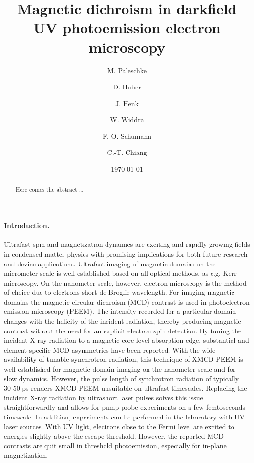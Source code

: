 \documentclass[prl,twocolumn,floatfix]{revtex4-2}
\begin{document}
\title{Magnetic dichroism in darkfield UV photoemission electron microscopy}

\author{M. Paleschke}
\author{D. Huber}
\author{J. Henk}
\author{W. Widdra}

\author{F. O. Schumann}

\author{C.-T. Chiang}

\date{\today}

\begin{abstract}
Here comes the abstract \ldots
\end{abstract}

\pacs{}

\maketitle
\paragraph{Introduction.} Ultrafast spin and magnetization dynamics are exciting and rapidly growing fields in condensed matter physics with promising implications for both future research and device applications. Ultrafast imaging of magnetic domains on the micrometer scale is well established based on all-optical methods, as e.g. Kerr microscopy. On the nanometer scale, however, electron microscopy is the method of choice due to electrons short de Broglie wavelength. 
For imaging magnetic domains the magnetic circular dichroism (MCD) contrast is used in photoelectron emission microscopy (PEEM). The intensity recorded for a particular domain changes with the helicity of the incident radiation, thereby producing magnetic contrast without the need for an explicit electron spin detection. By tuning the incident X-ray radiation to a magnetic core level absorption edge, substantial and element-specific MCD asymmetries have been reported. With the wide availability of tunable synchrotron radiation, this technique of XMCD-PEEM is well established for magnetic domain imaging on the nanometer scale and for slow dynamics. However, the pulse length of synchrotron radiation of typically 30-50 ps renders XMCD-PEEM unsuitable on ultrafast timescales. 
Replacing the incident X-ray radiation by ultrashort laser pulses solves this issue straightforwardly and allows for pump-probe experiments on a few femtoseconds timescale. In addition, experiments can be performed in the laboratory with UV laser sources. 
With UV light, electrons close to the Fermi level are excited to energies slightly above the escape threshold. However, the reported MCD contrasts are quit small in threshold photoemission, especially for in-plane magnetization. 
\end{document}
